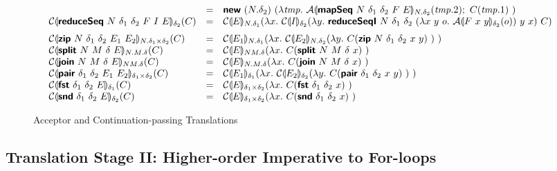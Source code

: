 \begin{figure}[H]
\begin{minipage}{1.0\linewidth}
\begin{displaymath}
\begin{array}{lcl}
        &=& \prim{new}~(N.\delta_2)~(\lambda \mathit{tmp}.~\semA{\prim{mapSeq}~N~\delta_1~\delta_2~F~E}_{N.\delta_2}(\mathit{tmp}.2);~C(\mathit{tmp}.1)~)
        \\
        \semE{\prim{reduceSeq}~N~\delta_1~\delta_2~F~I~E}_{\delta_2}(C)
        &=& \begin{array}[t]{@{}l}
              \semE{E}_{N.\delta_1}(\lambda x.~
              \semE{I}_{\delta_2}(\lambda y.~\prim{reduceSeqI}~N~\delta_1~\delta_2~(\lambda x~y~o.~\semA{F~x~y}_{\delta_2}(o))~y~x)~C)
            \end{array}
        \medskip\\
        \semE{\prim{zip}~N~\delta_1~\delta_2~E_1~E_2}_{N.\delta_1 \times \delta_2}(C)
        &=& \semE{E_1}_{N.\delta_1}(\lambda x.~\semE{E_2}_{N.\delta_2}(\lambda y.~C(\prim{zip}~N~\delta_1~\delta_2~x~y)~)~)
        \\
        \semE{\prim{split}~N~M~\delta~E}_{N.M.\delta}(C)
        &=& \semE{E}_{NM.\delta}(\lambda x.~C(\prim{split}~N~M~\delta~x)~)
        \\
        \semE{\prim{join}~N~M~\delta~E}_{NM.\delta}(C)
        &=& \semE{E}_{N.M.\delta}(\lambda x.~C(\prim{join}~N~M~\delta~x)~)
        \\
        \semE{\prim{pair}~\delta_1~\delta_2~E_1~E_2}_{\delta_1\times\delta_2}(C)
        &=& \semE{E_1}_{\delta_1}(\lambda x.~\semE{E_2}_{\delta_2}(\lambda y.~C(\prim{pair}~\delta_1~\delta_2~x~y)~)~)
        \\
        \semE{\prim{fst}~\delta_1~\delta_2~E}_{\delta_1}(C)
        &=& \semE{E}_{\delta_1\times\delta_2}(\lambda x.~C(\prim{fst}~\delta_1~\delta_2~x)~)
        \\
        \semE{\prim{snd}~\delta_1~\delta_2~E}_{\delta_2}(C)
        &=& \semE{E}_{\delta_1\times\delta_2}(\lambda x.~C(\prim{snd}~\delta_1~\delta_2~x)~)
        \\
      \end{array}
    \end{displaymath}
    \label{fig:transtwo}
  \end{minipage}
  \caption{Acceptor and Continuation-passing Translations}
\end{figure}

\clearpage

\subsection{Translation Stage II: Higher-order Imperative to For-loops}
\label{sec:translation-ii}

